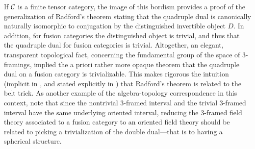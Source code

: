 \documentclass{amsart}
\begin{document}
If $\mathcal C$ is a finite tensor category, the image of this bordism provides a proof of the generalization of Radford's theorem \cite{MR0407069, MR2097289} stating that the quadruple dual is canonically naturally isomorphic to conjugation by the distinguished invertible object $D$.  In addition, for fusion categories the distinguished object is trivial, and thus that the quadruple dual for fusion categories is trivial.  Altogether, an elegant, transparent topological fact, concerning the fundamental group of the space of $3$-framings, implied the a priori rather more opaque theorem that the quadruple dual on a fusion category is trivializable. This makes rigorous the intuition (implicit in \cite{MR2559711}, and stated explicitly in \cite{0901.3975} ) that Radford's theorem is related to the belt trick.    As another example of the algebra-topology correspondence in this context, note that since the nontrivial $3$-framed interval and the trivial $3$-framed interval have the same underlying oriented interval, reducing the $3$-framed field theory associated to a fusion category to an oriented field theory should be related to picking a trivialization of the double dual---that is to having a spherical structure.
\end{document}
